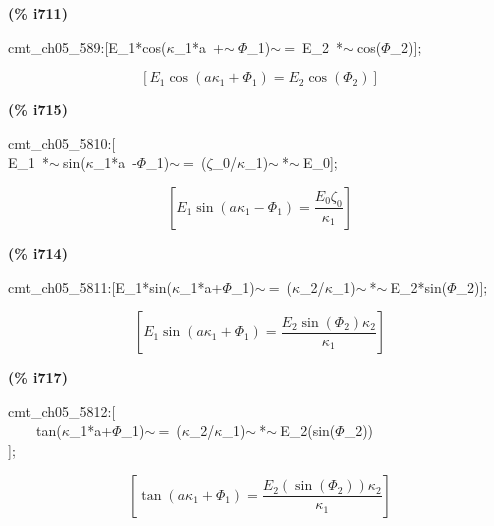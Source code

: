 \documentclass[fleqn]{article}
\begin{document}
\noindent
\begin{minipage}[t]{4.000000em}\color{red}\bfseries
(\% i711)	
\end{minipage}
\begin{minipage}[t]{\textwidth}\color{blue}
cmt\_ch05\_589:[E\_1*cos(\ensuremath{\kappa}\_1*a\ +\ensuremath{\sim\ }\ensuremath{\Phi}\_1)\ensuremath{\sim\ }=\ E\_2\ *\ensuremath{\sim\ }cos(\ensuremath{\Phi}\_2)];
\end{minipage}
\[\displaystyle \tag{\% o711} 
\left[ {E_1} \cos{\left( a {{\kappa }_1}+{{\Phi }_1}\right) }={E_2} \cos{\left( {{\Phi }_2}\right) }\right] \mbox{}
\]


\noindent
\begin{minipage}[t]{4.000000em}\color{red}\bfseries
(\% i715)	
\end{minipage}
\begin{minipage}[t]{\textwidth}\color{blue}
cmt\_ch05\_5810:[\\
E\_1\ *\ensuremath{\sim\ }sin(\ensuremath{\kappa}\_1*a\ -\ensuremath{\Phi}\_1)\ensuremath{\sim\ }=\ (\ensuremath{\zeta}\_0/\ensuremath{\kappa}\_1)\ensuremath{\sim\ }*\ensuremath{\sim\ }E\_0];
\end{minipage}
\[\displaystyle \tag{\% o715} 
\left[ {E_1} \sin{\left( a {{\kappa }_1}-{{\Phi }_1}\right) }=\frac{{E_0} {{\zeta }_0}}{{{\kappa }_1}}\right] \mbox{}
\]


\noindent
\begin{minipage}[t]{4.000000em}\color{red}\bfseries
(\% i714)	
\end{minipage}
\begin{minipage}[t]{\textwidth}\color{blue}
cmt\_ch05\_5811:[E\_1*sin(\ensuremath{\kappa}\_1*a+\ensuremath{\Phi}\_1)\ensuremath{\sim\ }=\ (\ensuremath{\kappa}\_2/\ensuremath{\kappa}\_1)\ensuremath{\sim\ }*\ensuremath{\sim\ }E\_2*sin(\ensuremath{\Phi}\_2)];
\end{minipage}
\[\displaystyle \tag{\% o714} 
\left[ {E_1} \sin{\left( a {{\kappa }_1}+{{\Phi }_1}\right) }=\frac{{E_2} \sin{\left( {{\Phi }_2}\right) } {{\kappa }_2}}{{{\kappa }_1}}\right] \mbox{}
\]


\noindent
\begin{minipage}[t]{4.000000em}\color{red}\bfseries
(\% i717)	
\end{minipage}
\begin{minipage}[t]{\textwidth}\color{blue}
cmt\_ch05\_5812:[\\
\ \ \ \ tan(\ensuremath{\kappa}\_1*a+\ensuremath{\Phi}\_1)\ensuremath{\sim\ }=\ (\ensuremath{\kappa}\_2/\ensuremath{\kappa}\_1)\ensuremath{\sim\ }*\ensuremath{\sim\ }E\_2(sin(\ensuremath{\Phi}\_2))\\
];
\end{minipage}
\[\displaystyle \tag{\% o717} 
\left[ \tan{\left( a {{\kappa }_1}+{{\Phi }_1}\right) }=\frac{{E_2}\left( \sin{\left( {{\Phi }_2}\right) }\right)  {{\kappa }_2}}{{{\kappa }_1}}\right] \mbox{}
\]
\end{document}

